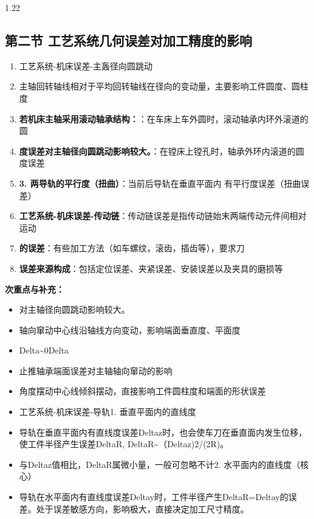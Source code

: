 \documentclass[12pt,a4paper]{article}
\begin{document}
\begin{spacing}{1.22}
\subsection{第二节 工艺系统几何误差对加工精度的影响}
\begin{tcolorbox}[colback=yellow!6,colframe=red!55!black,title=重点,left=1mm,right=1mm]
\begin{enumerate}[leftmargin=2.2em,label=\arabic*.]
  \item 工艺系统-机床误差-主轰径向圆跳动
  \item 主轴回转轴线相对于平均回转轴线在径向的变动量，主要影响工件圆度、圆柱度
  \item \textbf{若机床主轴采用滚动轴承结构：}：在车床上车外圆时，滚动轴承内环外滚道的圆
  \item \textbf{度误差对主轴径向圆跳动影响较大。}：在镗床上镗孔时，轴承外环内滚道的圆度误差
  \item \textbf{3. 两导轨的平行度（扭曲）}：当前后导轨在垂直平面内 有平行度误差（扭曲误差）
  \item \textbf{工艺系统-机床误差-传动链}：传动链误差是指传动链始末两端传动元件间相对运动
  \item \textbf{的误差}：有些加工方法（如车螺纹，滚齿，插齿等），要求刀
  \item \textbf{误差来源构成}：包括定位误差、夹紧误差、安装误差以及夹具的磨损等
\end{enumerate}
\end{tcolorbox}
\noindent\textbf{次重点与补充：}
\begin{itemize}[leftmargin=2.2em,label=--]
  \item 对主轴径向圆跳动影响较大。
  \item 轴向窜动中心线沿轴线方向变动，影响端面垂直度、平面度
  \item Delta\textasciitilde{}0Delta
  \item 止推轴承端面误差对主轴轴向窜动的影响
  \item 角度摆动中心线倾斜摆动，直接影响工件圆柱度和端面的形状误差
  \item 工艺系统-机床误差-导轨1. 垂直平面内的直线度
  \item 导轨在垂直平面内有直线度误差Deltaz时，也会使车刀在垂直面内发生位移，使工件半径产生误差DeltaR, DeltaR\textasciitilde{}（Deltaz)2/(2R)。
  \item 与Deltaz值相比，DeltaR属微小量，一般可忽略不计2. 水平面内的直线度（核心）
  \item 导轨在水平面内有直线度误差Deltay时，工件半径产生DeltaR=Deltay的误差。处于误差敏感方向，影响极大，直接决定加工尺寸精度。

\end{itemize}
\end{spacing}
\end{document}
